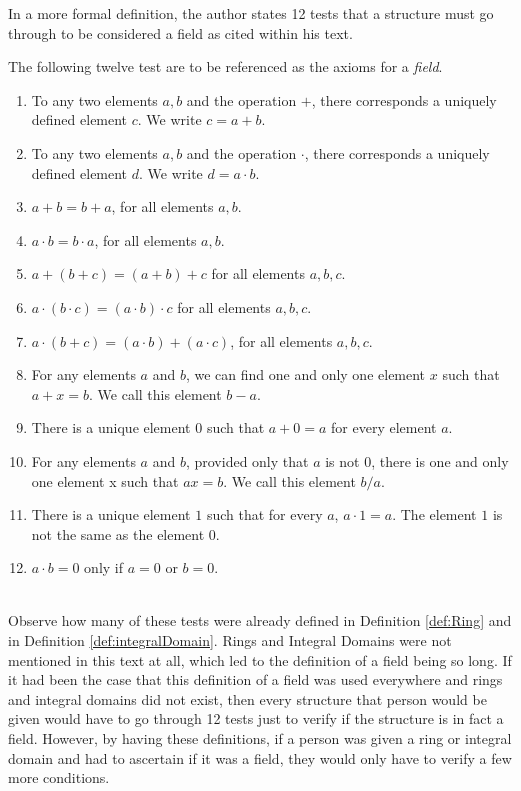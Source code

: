 \documentclass{article}
\begin{document}
In a more formal definition, the author states 12 tests that a structure must go through to be considered a field as cited within his text.
\begin{definition}
    The following twelve test are to be referenced as the axioms for a \emph{field}.
    \begin{enumerate}
        \item To any two elements $a, b$ and the operation $+$, there corresponds a uniquely defined element $c$. We write $c=a+b$.
        \item To any two elements $a, b$ and the operation $\cdot$, there corresponds a uniquely defined element $d$. We write 
            $d=a \cdot b$.
        \item $a + b = b + a$, for all elements $a,b$.
        \item $a \cdot b = b \cdot a$, for all elements $a,b$.
        \item $a + (b + c) = (a + b) + c$ for all elements $a,b,c$.
        \item $a \cdot (b \cdot c) = (a \cdot b) \cdot c$ for all elements $a,b,c$.
        \item $a \cdot (b + c) = (a \cdot b) + (a \cdot c)$, for all elements $a,b,c$.
        \item For any elements $a$ and $b$, we can find one and only one element $x$ such that $a + x = b$. 
            We call this element $b-a$.
        \item There is a unique element $0$ such that $a + 0 = a$ for every element $a$.
        \item For any elements $a$ and $b$, provided only that $a$ is not $0$, there is one and only one element x such that $ax = b$.
            We call this element $b/a$.
        \item There is a unique element $1$ such that for every $a$, $a \cdot 1 = a$. 
            The element $1$ is not the same as the element 0.
        \item $a \cdot b = 0$ only if $a = 0$ or $b = 0$. \\
    \end{enumerate}
\end{definition} \cite{Concrete} \\

Observe how many of these tests were already defined in Definition \ref{def:Ring} and in Definition \ref{def:integralDomain}.
Rings and Integral Domains were not mentioned in this text at all, which led to the definition of a field being so long. If it had been the case that this definition of a field was used everywhere and rings and integral domains did not exist, then every structure that person would be given would have to go through 12 tests just to verify if the structure is in fact a field. However, by having these
definitions, if a person was given a ring or integral domain and had to ascertain if it was a field, they would only have to verify a few more conditions.
\end{document}
